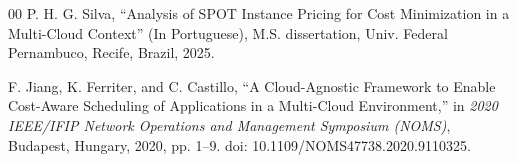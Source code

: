 \documentclass[conference]{IEEEtran}
\begin{document}
\begin{thebibliography}{00}
		 P. H. G. Silva, ``Analysis of SPOT Instance Pricing for Cost Minimization in a Multi-Cloud Context'' (In Portuguese), M.S. dissertation, Univ. Federal Pernambuco, Recife, Brazil, 2025.
		
		 F. Jiang, K. Ferriter, and C. Castillo, ``A Cloud-Agnostic Framework to Enable Cost-Aware Scheduling of Applications in a Multi-Cloud Environment,'' in \emph{2020 IEEE/IFIP Network Operations and Management Symposium (NOMS)}, Budapest, Hungary, 2020, pp. 1--9. doi: 10.1109/NOMS47738.2020.9110325.
		
	\end{thebibliography}
	
	
	
	
\end{document}

